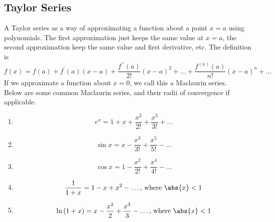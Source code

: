 \subsection{Taylor Series}
\noindent
A Taylor series as a way of approximating a function about a point $x=a$ using polynomials. The first approximation just keeps the same value at $x=a$, the second approximation keep the same value and first derivative, etc. The definition is
\begin{equation*}
	f(x) = f(a)+f^\prime(a)(x-a) + \frac{f^{\prime\prime}(a)}{2!}(x-a)^2 + \ldots +  \frac{f^{(n)}(a)}{n!}(x-a)^n + \ldots
\end{equation*}
If we approximate a function about $x=0$, we call this a Maclaurin series.\\

\noindent
Below are some common Maclaurin series, and their radii of convergence if applicable.
\begin{enumerate}[]
	\item \begin{equation*}
		e^x = 1 + x + \frac{x^2}{2!} + \frac{x^3}{3!} + \ldots
	\end{equation*}
	\item \begin{equation*}
		\sin{x} = x - \frac{x^3}{3!} + \frac{x^5}{5!} - \ldots
	\end{equation*}
	\item \begin{equation*}
		\cos{x} = 1 - \frac{x^2}{2!} + \frac{x^4}{4!} - \ldots
	\end{equation*}
	\item \begin{equation*}
		\frac{1}{1+x} = 1 - x + x^2 - \ldots \text{, where } \abs{x} < 1
	\end{equation*}
	\item \begin{equation*}
		\ln{(1+x)} = x - \frac{x^2}{2} + \frac{x^3}{3} - \ldots \text{, where } \abs{x} < 1
	\end{equation*}
\end{enumerate}

